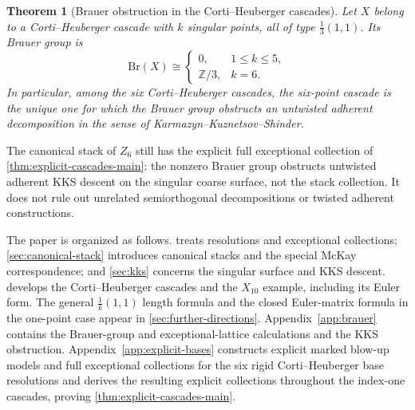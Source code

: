 \documentclass[11pt]{article}
\theoremstyle{plain}
\newtheorem{theorem}{Theorem}[section]
\theoremstyle{definition}
\theoremstyle{remark}
\newcommand{\Z}{\mathbb Z}
\newcommand{\Br}{\mathrm{Br}}
\begin{document}
\begin{theorem}[Brauer obstruction in the Corti--Heuberger cascades]
\label{thm:brauer-cascades-intro}
Let \(X\) belong to a Corti--Heuberger cascade with \(k\) singular points, all
of type \(\frac13(1,1)\). Its Brauer group is
\[
\Br(X)
\cong
\begin{cases}
0, & 1\leq k\leq 5,\\
\Z/3, & k=6.
\end{cases}
\]
In particular, among the six Corti--Heuberger cascades, the six-point cascade
is the unique one for which the Brauer group obstructs an untwisted adherent
decomposition in the sense of Karmazyn--Kuznetsov--Shinder.
\end{theorem}

The canonical stack of \(Z_6\) still has the explicit full exceptional
collection of \cref{thm:explicit-cascades-main}: the nonzero Brauer
group obstructs untwisted adherent KKS descent on the singular coarse
surface, not the stack collection. It does not rule out unrelated
semiorthogonal decompositions or twisted adherent constructions.

The paper is organized as follows.  treats resolutions
and exceptional collections; \cref{sec:canonical-stack} introduces canonical
stacks and the special McKay correspondence; and \cref{sec:kks} concerns the
singular surface and KKS descent.  develops the
Corti--Heuberger cascades and the \(X_{10}\) example, including its Euler form.
The general \(\frac1k(1,1)\) length formula and the closed Euler-matrix formula
in the one-point case appear in \cref{sec:further-directions}. Appendix~\ref{app:brauer}
contains the Brauer-group and exceptional-lattice calculations and the
KKS obstruction. Appendix~\ref{app:explicit-bases} constructs explicit
marked blow-up models and full exceptional collections for the six rigid
Corti--Heuberger base resolutions and derives the resulting explicit
collections throughout the index-one cascades, proving
\cref{thm:explicit-cascades-main}.
\end{document}
